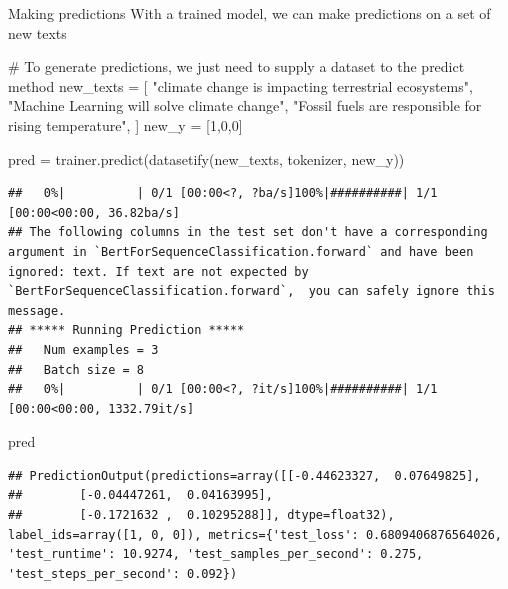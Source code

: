 \documentclass[
  10pt,
  ignorenonframetext,
  aspectratio=169]{beamer}
\newenvironment{Shaded}{\begin{snugshade}}{\end{snugshade}}
\newcommand{\CommentTok}[1]{\textcolor[rgb]{0.50,0.62,0.50}{#1}}
\newcommand{\DecValTok}[1]{\textcolor[rgb]{0.86,0.86,0.80}{#1}}
\newcommand{\NormalTok}[1]{\textcolor[rgb]{0.80,0.80,0.80}{#1}}
\newcommand{\OperatorTok}[1]{\textcolor[rgb]{0.94,0.94,0.82}{#1}}
\newcommand{\StringTok}[1]{\textcolor[rgb]{0.80,0.58,0.58}{#1}}
\begin{document}
\begin{frame}[fragile]{Making predictions}
\protect\hypertarget{making-predictions}{}
With a trained model, we can make predictions on a set of new texts

\medskip
\scriptsize

\begin{Shaded}
\begin{Highlighting}[]
\CommentTok{\# To generate predictions, we just need to supply a dataset to the predict method}
\NormalTok{new\_texts }\OperatorTok{=}\NormalTok{ [}
    \StringTok{"climate change is impacting terrestrial ecosystems"}\NormalTok{,}
    \StringTok{"Machine Learning will solve climate change"}\NormalTok{,}
    \StringTok{"Fossil fuels are responsible for rising temperature"}\NormalTok{,}
\NormalTok{]}
\NormalTok{new\_y }\OperatorTok{=}\NormalTok{ [}\DecValTok{1}\NormalTok{,}\DecValTok{0}\NormalTok{,}\DecValTok{0}\NormalTok{]}

\NormalTok{pred }\OperatorTok{=}\NormalTok{ trainer.predict(datasetify(new\_texts, tokenizer, new\_y))}
\end{Highlighting}
\end{Shaded}

\begin{verbatim}
##   0%|          | 0/1 [00:00<?, ?ba/s]100%|##########| 1/1 [00:00<00:00, 36.82ba/s]
## The following columns in the test set don't have a corresponding argument in `BertForSequenceClassification.forward` and have been ignored: text. If text are not expected by `BertForSequenceClassification.forward`,  you can safely ignore this message.
## ***** Running Prediction *****
##   Num examples = 3
##   Batch size = 8
##   0%|          | 0/1 [00:00<?, ?it/s]100%|##########| 1/1 [00:00<00:00, 1332.79it/s]
\end{verbatim}

\begin{Shaded}
\begin{Highlighting}[]
\NormalTok{pred}
\end{Highlighting}
\end{Shaded}

\begin{verbatim}
## PredictionOutput(predictions=array([[-0.44623327,  0.07649825],
##        [-0.04447261,  0.04163995],
##        [-0.1721632 ,  0.10295288]], dtype=float32), label_ids=array([1, 0, 0]), metrics={'test_loss': 0.6809406876564026, 'test_runtime': 10.9274, 'test_samples_per_second': 0.275, 'test_steps_per_second': 0.092})
\end{verbatim}
\end{frame}
\end{document}
